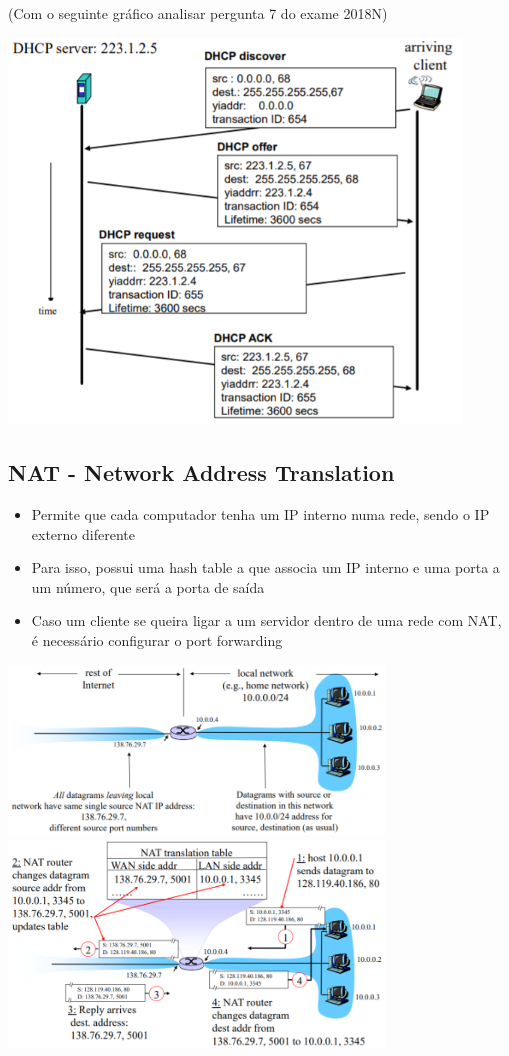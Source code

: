 \documentclass{article}
\begin{document}
(Com o seguinte gráfico analisar pergunta 7 do exame 2018N)
\begin{center}
    \includegraphics[width=12cm]{images/RCOM26.png}
\end{center}

\subsection{NAT - Network Address Translation}
\begin{itemize}
    \item Permite que cada computador tenha um IP interno numa rede, sendo o IP externo diferente
    \item Para isso, possui uma hash table a que associa um IP interno e uma porta a um número, que será a porta de saída
    \item Caso um cliente se queira ligar a um servidor dentro de uma rede com NAT, é necessário configurar o port forwarding

\end{itemize}
\begin{center}
    \includegraphics[width=10cm]{images/RCOM27.png}
    \includegraphics[width=10cm]{images/RCOM28.png}
\end{center}
\end{document}
